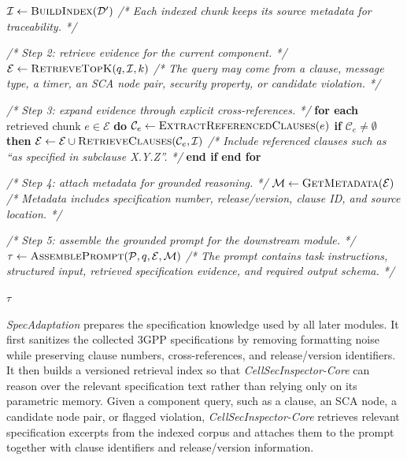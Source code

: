 \documentclass[sigconf]{acmart}
\newcommand{\core}{\textit{CellSecInspector-Core}\xspace}
\begin{document}
{\begin{algorithm}[ht]
\begin{algorithmic}[1]
\State $\mathcal{I} \leftarrow \textsc{BuildIndex}(\mathcal{D}')$
\State \textit{/* Each indexed chunk keeps its source metadata for traceability. */}

\State \textit{/* Step 2: retrieve evidence for the current component. */}
\State $\mathcal{E} \leftarrow \textsc{RetrieveTopK}(q,\mathcal{I},k)$
\State \textit{/* The query may come from a clause, message type, a timer, an SCA node pair, security property, or candidate violation. */}

\State \textit{/* Step 3: expand evidence through explicit cross-references. */}
\State \textbf{for each} retrieved chunk $e \in \mathcal{E}$ \textbf{do}
    \State \quad $\mathcal{C}_e \leftarrow \textsc{ExtractReferencedClauses}(e)$
    \State \quad \textbf{if} $\mathcal{C}_e \neq \emptyset$ \textbf{then}
        \State \quad\quad $\mathcal{E} \leftarrow \mathcal{E} \cup \textsc{RetrieveClauses}(\mathcal{C}_e,\mathcal{I})$
        \State \quad\quad \textit{/* Include referenced clauses such as ``as specified in subclause X.Y.Z''. */}
    \State \quad \textbf{end if}
\State \textbf{end for}

\State \textit{/* Step 4: attach metadata for grounded reasoning. */}
\State $\mathcal{M} \leftarrow \textsc{GetMetadata}(\mathcal{E})$
\State \textit{/* Metadata includes specification number, release/version, clause ID, and source location. */}

\State \textit{/* Step 5: assemble the grounded prompt for the downstream module. */}
\State $\tau \leftarrow \textsc{AssemblePrompt}(\mathcal{P}, q, \mathcal{E}, \mathcal{M})$
\State \textit{/* The prompt contains task instructions, structured input, retrieved specification evidence, and required output schema. */}

\State \Return $\tau$

\end{algorithmic}
\end{algorithm}



\textit{SpecAdaptation} prepares the specification knowledge used by all later modules. It first sanitizes the collected 3GPP specifications by removing formatting noise while preserving clause numbers, cross-references, and release/version identifiers. It then builds a versioned retrieval index so that \core can reason over the relevant specification text rather than relying only on its parametric memory. Given a component query, such as a clause, an SCA node, a candidate node pair, or flagged violation, \core retrieves relevant specification excerpts from the indexed corpus and attaches them to the prompt together with clause identifiers and release/version information.

}
\end{document}
